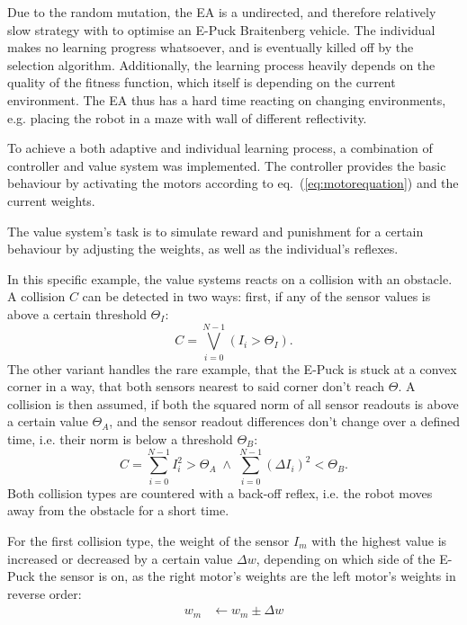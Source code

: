\documentclass[a4paper]{jacow}
\begin{document}
Due to the random mutation, the EA is a undirected, and therefore relatively slow strategy with to optimise an E-Puck Braitenberg vehicle. The individual makes no learning progress whatsoever, and is eventually killed off by the selection algorithm. Additionally, the learning process heavily depends on the quality of the fitness function, which itself is depending on the current environment. The EA thus has a hard time reacting on changing environments, e.g. placing the robot in a maze with wall of different reflectivity.

To achieve a both adaptive and individual learning process, a combination of controller and value system was implemented. The controller provides the basic behaviour by activating the motors according to eq.~(\ref{eq:motorequation}) and the current weights.

The value system's task is to simulate reward and punishment for a certain behaviour by adjusting the weights, as well as the individual's reflexes.

In this specific example, the value systems reacts on a collision with an obstacle. A collision $C$ can be detected in two ways: first, if any of the sensor values is above a certain threshold $\Theta_I$:
\begin{equation}
	C = \bigvee\limits_{i=0}^{N-1} \left( I_i > \Theta_I \right). 
\end{equation}
The other variant handles the rare example, that the E-Puck is stuck at a convex corner in a way, that both sensors nearest to said corner don't reach $\Theta$. A collision is then assumed, if both the squared norm of all sensor readouts is above a certain value $\Theta_A$, and the sensor readout differences don't change over a defined time, i.e. their norm is below a threshold $\Theta_B$:
\begin{equation}
	C = \sum\limits_{i=0}^{N-1} I_i^2 > \Theta_A \;\wedge\; \sum\limits_{i=0}^{N-1} (\Delta I_i)^2 < \Theta_B.
\end{equation}
Both collision types are countered with a back-off reflex, i.e. the robot moves away from the obstacle for a short time.

For the first collision type, the weight of the sensor $I_m$ with the highest value is increased or decreased by a certain value $\Delta w$, depending on which side of the E-Puck the sensor is on, as the right motor's weights are the left motor's weights in reverse order:
\begin{align}
	w_m &\leftarrow w_m \pm \Delta w\label{eq:weightcorrection}
\end{align}
\end{document}
